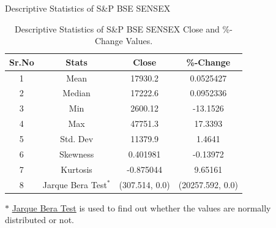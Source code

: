\documentclass{beamer}
\begin{document}
\begin{frame}{Descriptive Statistics of S\&P BSE SENSEX}
	\begin{table}[htbp]
		\centering
		\begin{tabular}{c c c c}
			\textbf{Sr.No} & \textbf{Stats}         & \textbf{Close} & \textbf{\%-Change} \\
			\toprule
			1              & Mean                   & 17930.2        & 0.0525427          \\
			2              & Median                 & 17222.6        & 0.0952336          \\
			3              & Min                    & 2600.12        & -13.1526           \\
			4              & Max                    & 47751.3        & 17.3393            \\
			5              & Std. Dev               & 11379.9        & 1.4641             \\
			6              & Skewness               & 0.401981       & -0.13972           \\
			7              & Kurtosis               & -0.875044      & 9.65161            \\
			8              & Jarque Bera Test$^{*}$ & (307.514, 0.0) & (20257.592, 0.0)   \\
			\bottomrule
		\end{tabular}
		\caption{Descriptive Statistics of S\&P BSE SENSEX Close and \%-Change Values.}
		\label{tab:my_label}
	\end{table}
	$*$ \href{https://cutt.ly/5nwffCF}{Jarque Bera Test} is used to find out whether the values are normally distributed or not.
\end{frame}
\end{document}
